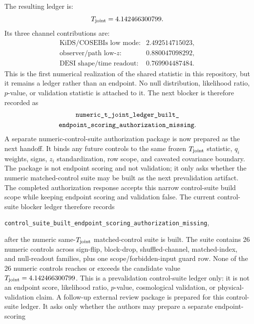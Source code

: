 \documentclass[11pt]{article}
\begin{document}
The resulting ledger is:
\[
T_{\rm joint}=4.142466300799 .
\]
Its three channel contributions are:
\[
\begin{array}{ll}
\text{KiDS/COSEBIs low mode:} & 2.492514715023,\\
\text{observer/path low-}z\text{:} & 0.880047098292,\\
\text{DESI shape/time readout:} & 0.769904487484 .
\end{array}
\]
This is the first numerical realization of the shared statistic in this
repository, but it remains a ledger rather than an endpoint.  No null
distribution, likelihood ratio, \(p\)-value, or validation statistic is
attached to it.  The next blocker is therefore recorded as
\[
\begin{gathered}
\texttt{numeric\_\allowbreak{}t\_\allowbreak{}joint\_\allowbreak{}ledger\_\allowbreak{}built\_\allowbreak{}}\\
\texttt{endpoint\_\allowbreak{}scoring\_\allowbreak{}authorization\_\allowbreak{}missing}.
\end{gathered}
\]
A separate numeric-control-suite authorization package is now prepared as the
next handoff.  It binds any future controls to the same frozen
\(T_{\rm joint}\) statistic, \(q_i\) weights, signs, \(z_i\) standardization,
row scope, and caveated covariance boundary.  The package is not endpoint
scoring and not validation; it only asks whether the numeric matched-control
suite may be built as the next prevalidation artifact.
The completed authorization response accepts this narrow control-suite build
scope while keeping endpoint scoring and validation false.  The current
control-suite blocker ledger therefore records
\begin{center}\texttt{control\_\allowbreak{}suite\_\allowbreak{}built\_\allowbreak{}endpoint\_\allowbreak{}scoring\_\allowbreak{}authorization\_\allowbreak{}missing},\end{center}
after the numeric same-\(T_{\rm joint}\) matched-control suite is built.  The
suite contains 26 numeric controls across sign-flip, block-drop,
shuffled-channel, matched-index, and null-readout families, plus one
scope/forbidden-input guard row.  None of the 26 numeric controls reaches or
exceeds the candidate value \(T_{\rm joint}=4.142466300799\).  This is a
prevalidation control-suite ledger only: it is not an endpoint score,
likelihood ratio, \(p\)-value, cosmological validation, or physical-validation
claim.
A follow-up external review package is prepared for this control-suite ledger.
It asks only whether the authors may prepare a separate endpoint-scoring
\end{document}
